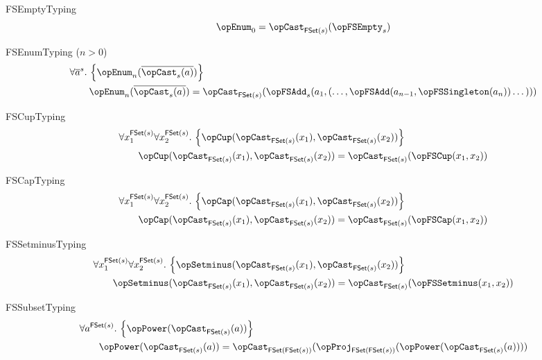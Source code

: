 \documentclass[11pt, a4paper, oneside]{article}
\begin{document}
\begin{axioms}
\item[FSEmptyTyping] \[
        \opEnum_0 = \opCast_{\FSet(s)}(\opFSEmpty_s)
    \]

\item[FSEnumTyping ($n > 0$)] \[
        \begin{aligned}
            &\forall \overline{a}^s.\, \st{ \opEnum_n(\overline{\opCast_s(a)}) } \\
            &\qquad \opEnum_n(\overline{\opCast_s(a)}) = \opCast_{\FSet(s)}(\opFSAdd_s(a_1, (\dots, \opFSAdd(a_{n-1}, \opFSSingleton(a_n)) \dots)))
        \end{aligned}
    \]

\item[FSCupTyping] \[
        \begin{aligned}
            &\forall x_1^{\FSet(s)} \forall x_2^{\FSet(s)}.\, \st{ \opCup(\opCast_{\FSet(s)}(x_1), \opCast_{\FSet(s)}(x_2)) } \\
            &\qquad \opCup(\opCast_{\FSet(s)}(x_1), \opCast_{\FSet(s)}(x_2)) = \opCast_{\FSet(s)}(\opFSCup(x_1, x_2))
        \end{aligned}
    \]

\item[FSCapTyping] \[
        \begin{aligned}
            &\forall x_1^{\FSet(s)} \forall x_2^{\FSet(s)}.\, \st{ \opCap(\opCast_{\FSet(s)}(x_1), \opCast_{\FSet(s)}(x_2)) } \\
            &\qquad \opCap(\opCast_{\FSet(s)}(x_1), \opCast_{\FSet(s)}(x_2)) = \opCast_{\FSet(s)}(\opFSCap(x_1, x_2))
        \end{aligned}
    \]

\item[FSSetminusTyping] \[
        \begin{aligned}
            &\forall x_1^{\FSet(s)} \forall x_2^{\FSet(s)}.\, \st{ \opSetminus(\opCast_{\FSet(s)}(x_1), \opCast_{\FSet(s)}(x_2)) } \\
            &\qquad \opSetminus(\opCast_{\FSet(s)}(x_1), \opCast_{\FSet(s)}(x_2)) = \opCast_{\FSet(s)}(\opFSSetminus(x_1, x_2))
        \end{aligned}
    \]

\item[FSSubsetTyping] \[
        \begin{aligned}
            &\forall a^{\FSet(s)}.\, \st{ \opPower(\opCast_{\FSet(s)}(a)) } \\
            &\qquad \opPower(\opCast_{\FSet(s)}(a)) = \opCast_{\FSet(\FSet(s))}(\opProj_{\FSet(\FSet(s))}(\opPower(\opCast_{\FSet(s)}(a))))
        \end{aligned}
    \]


\end{axioms}
\end{document}
